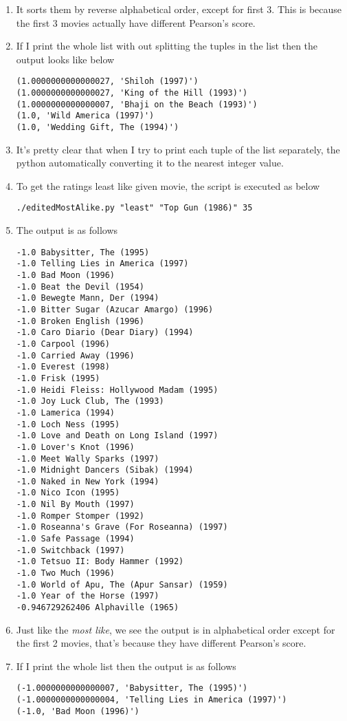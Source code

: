 \begin{enumerate}
\item It sorts them by reverse alphabetical order, except for first 3. This is because the first 3 movies actually have different Pearson's score. 
\item If I print the whole list with out splitting the tuples in the list then the output looks like below
\begin{lstlisting}[frame=single]
(1.0000000000000027, 'Shiloh (1997)')
(1.0000000000000027, 'King of the Hill (1993)')
(1.0000000000000007, 'Bhaji on the Beach (1993)')
(1.0, 'Wild America (1997)')
(1.0, 'Wedding Gift, The (1994)')
\end{lstlisting}
\item It's pretty clear that when I try to print each tuple of the list separately, the python automatically converting it to the nearest integer value. 
\item To get the ratings least like given movie, the script is executed as below 
\begin{lstlisting}[frame=single,breaklines=true]
./editedMostAlike.py "least" "Top Gun (1986)" 35
\end{lstlisting}
\item The output is as follows 
\begin{lstlisting}[frame=single]
-1.0 Babysitter, The (1995)
-1.0 Telling Lies in America (1997)
-1.0 Bad Moon (1996)
-1.0 Beat the Devil (1954)
-1.0 Bewegte Mann, Der (1994)
-1.0 Bitter Sugar (Azucar Amargo) (1996)
-1.0 Broken English (1996)
-1.0 Caro Diario (Dear Diary) (1994)
-1.0 Carpool (1996)
-1.0 Carried Away (1996)
-1.0 Everest (1998)
-1.0 Frisk (1995)
-1.0 Heidi Fleiss: Hollywood Madam (1995)
-1.0 Joy Luck Club, The (1993)
-1.0 Lamerica (1994)
-1.0 Loch Ness (1995)
-1.0 Love and Death on Long Island (1997)
-1.0 Lover's Knot (1996)
-1.0 Meet Wally Sparks (1997)
-1.0 Midnight Dancers (Sibak) (1994)
-1.0 Naked in New York (1994)
-1.0 Nico Icon (1995)
-1.0 Nil By Mouth (1997)
-1.0 Romper Stomper (1992)
-1.0 Roseanna's Grave (For Roseanna) (1997)
-1.0 Safe Passage (1994)
-1.0 Switchback (1997)
-1.0 Tetsuo II: Body Hammer (1992)
-1.0 Two Much (1996)
-1.0 World of Apu, The (Apur Sansar) (1959)
-1.0 Year of the Horse (1997)
-0.946729262406 Alphaville (1965)
\end{lstlisting}

\item Just like the \emph{most like}, we see the output is in alphabetical order except for the first 2 movies, that's because they have different Pearson's score. 
\item If I print the whole list then the output is as follows 

\begin{lstlisting}[frame=single,breaklines=true]
(-1.0000000000000007, 'Babysitter, The (1995)')
(-1.0000000000000004, 'Telling Lies in America (1997)')
(-1.0, 'Bad Moon (1996)')
\end{lstlisting}

\end{enumerate}
